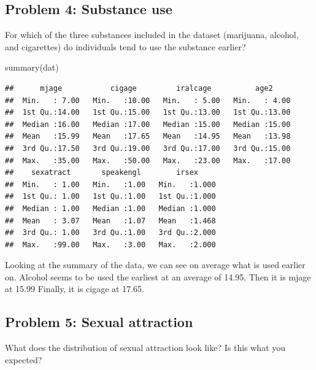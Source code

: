 \documentclass[
]{article}
\newenvironment{Shaded}{\begin{snugshade}}{\end{snugshade}}
\newcommand{\FunctionTok}[1]{\textcolor[rgb]{0.00,0.00,0.00}{#1}}
\newcommand{\NormalTok}[1]{#1}
\newcommand{\SpecialCharTok}[1]{\textcolor[rgb]{0.00,0.00,0.00}{#1}}
\begin{document}
\hypertarget{problem-4-substance-use}{%
\subsection{Problem 4: Substance use}\label{problem-4-substance-use}}

For which of the three substances included in the dataset (marijuana,
alcohol, and cigarettes) do individuals tend to use the substance
earlier?

\begin{Shaded}
\begin{Highlighting}[]
\FunctionTok{summary}\NormalTok{(dat)}
\end{Highlighting}
\end{Shaded}

\begin{verbatim}
##      mjage           cigage         iralcage          age2      
##  Min.   : 7.00   Min.   :10.00   Min.   : 5.00   Min.   : 4.00  
##  1st Qu.:14.00   1st Qu.:15.00   1st Qu.:13.00   1st Qu.:13.00  
##  Median :16.00   Median :17.00   Median :15.00   Median :15.00  
##  Mean   :15.99   Mean   :17.65   Mean   :14.95   Mean   :13.98  
##  3rd Qu.:17.50   3rd Qu.:19.00   3rd Qu.:17.00   3rd Qu.:15.00  
##  Max.   :35.00   Max.   :50.00   Max.   :23.00   Max.   :17.00  
##    sexatract       speakengl        irsex      
##  Min.   : 1.00   Min.   :1.00   Min.   :1.000  
##  1st Qu.: 1.00   1st Qu.:1.00   1st Qu.:1.000  
##  Median : 1.00   Median :1.00   Median :1.000  
##  Mean   : 3.07   Mean   :1.07   Mean   :1.468  
##  3rd Qu.: 1.00   3rd Qu.:1.00   3rd Qu.:2.000  
##  Max.   :99.00   Max.   :3.00   Max.   :2.000
\end{verbatim}

Looking at the summary of the data, we can see on average what is used
earlier on. Alcohol seems to be used the earliest at an average of
14.95. Then it is mjage at 15.99 Finally, it is cigage at 17.65.

\hypertarget{problem-5-sexual-attraction}{%
\subsection{Problem 5: Sexual
attraction}\label{problem-5-sexual-attraction}}

What does the distribution of sexual attraction look like? Is this what
you expected?

\begin{Shaded}
\end{Shaded}
\end{document}
